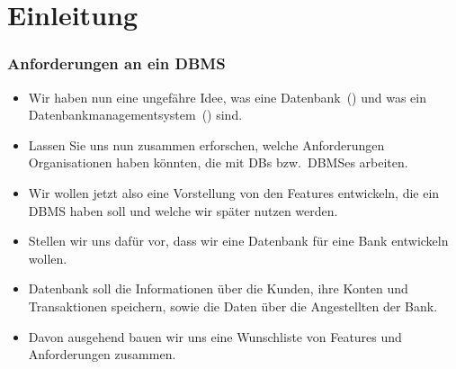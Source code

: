 \documentclass[aspectratio=169,mathserif,notheorems]{beamer}%
\subtitle{3.~Anforderungen an ein DBMS}%
\begin{document}
%
%
\startPresentation%
%
\section{Einleitung}%
%
\begin{frame}[t]%
\frametitle{Anforderungen an ein DBMS}%
\begin{itemize}%
%
\item Wir haben nun eine ungefähre Idee, was eine Datenbank~() und was ein Datenbankmanagementsystem~() sind.%
\item<2-> Lassen Sie uns nun zusammen erforschen, welche Anforderungen Organisationen haben könnten, die mit DBs bzw.\ DBMSes arbeiten.%
\item<3-> Wir wollen jetzt also eine Vorstellung von den Features entwickeln, die ein DBMS haben soll und welche wir später nutzen werden.\bigskip%
\item<4-> Stellen wir uns dafür vor, dass wir eine Datenbank für eine Bank entwickeln wollen.%
\item<5-> Datenbank soll die Informationen über die Kunden, ihre Konten und Transaktionen speichern, sowie die Daten über die Angestellten der Bank.%
\item<6-> Davon ausgehend bauen wir uns eine Wunschliste von Features und Anforderungen zusammen.%
%
\end{itemize}%
\end{frame}%
%
\end{document}
